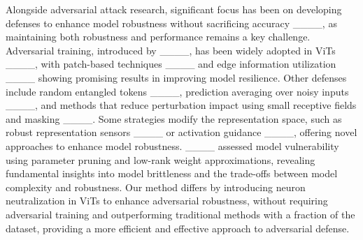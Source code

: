 Alongside adversarial attack research, significant focus has been on developing defenses to enhance model robustness without sacrificing accuracy ____, as maintaining both robustness and performance remains a key challenge. Adversarial training, introduced by ____, has been widely adopted in ViTs ____, with patch-based techniques ____ and edge information utilization ____ showing promising results in improving model resilience. Other defenses include random entangled tokens ____, prediction averaging over noisy inputs ____, and methods that reduce perturbation impact using small receptive fields and masking ____. Some strategies modify the representation space, such as robust representation sensors ____ or activation guidance ____, offering novel approaches to enhance model robustness. ____ assessed model vulnerability using parameter pruning and low-rank weight approximations, revealing fundamental insights into model brittleness and the trade-offs between model complexity and robustness. Our method differs by introducing neuron neutralization in ViTs to enhance adversarial robustness, without requiring adversarial training and outperforming traditional methods with a fraction of the dataset, providing a more efficient and effective approach to adversarial defense.
